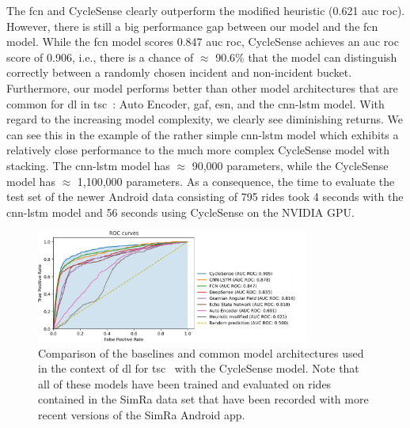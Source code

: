 The \ac{fcn} and CycleSense clearly outperform the modified heuristic (0.621 \ac{auc} \ac{roc}).
However, there is still a big performance gap between our model and the \ac{fcn} model.
While the \ac{fcn} model scores 0.847 \ac{auc} \ac{roc}, CycleSense achieves an \ac{auc} \ac{roc} score of 0.906, i.e., there is a chance of $\approx$ 90.6\% that the model can distinguish correctly between a randomly chosen incident and non-incident bucket.
Furthermore, our model performs better than other model architectures that are common for \ac{dl} in \ac{tsc}~\cite{ismail2019deep}: Auto Encoder, \ac{gaf}, \ac{esn}, and the \ac{cnn}-\ac{lstm} model.
With regard to the increasing model complexity, we clearly see diminishing returns.
We can see this in the example of the rather simple \ac{cnn}-\ac{lstm} model which exhibits a relatively close performance to the much more complex CycleSense model with stacking.
The \ac{cnn}-\ac{lstm} model has $\approx$ 90,000 parameters, while the CycleSense model has $\approx$ 1,100,000 parameters.
As a consequence, the time to evaluate the test set of the newer Android data consisting of 795 rides took 4 seconds with the \ac{cnn}-\ac{lstm} model and 56 seconds using CycleSense on the NVIDIA GPU.

\begin{figure}[t]
	\centering
	\includegraphics[width=0.8\textwidth]{fig/roc_auc_results_legend.png}
	\caption{Comparison of the baselines and common model architectures used in the context of \ac{dl} for \ac{tsc}~\cite{ismail2019deep} with the CycleSense model. Note that all of these models have been trained and evaluated on rides contained in the SimRa data set that have been recorded with more recent versions of the SimRa Android app.}
	\label{fig:roc-auc-results}
\end{figure}

